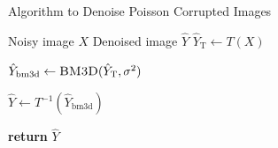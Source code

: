 \begin{algorithm}
    \caption{Algorithm to Denoise Poisson Corrupted Images}\label{alg:anscombe-bm3d}
    \begin{algorithmic}[1]
    \Require Noisy image $X$
    \Ensure Denoised image $\hat{Y}$
    \Statex
        \State $\hat{Y}_{\text{T}} \gets T(X)$
        
        \State $\hat{Y}_{\text{bm3d}} \gets \textsc{BM3D}(\hat{Y}_{\text{T}}, \sigma^2)$
        
        \State $\hat{Y} \gets T^{-1}(\hat{Y}_{\text{bm3d}})$
        
        \State \textbf{return} $\hat{Y}$
    \EndProcedure
    \end{algorithmic}
\end{algorithm}


